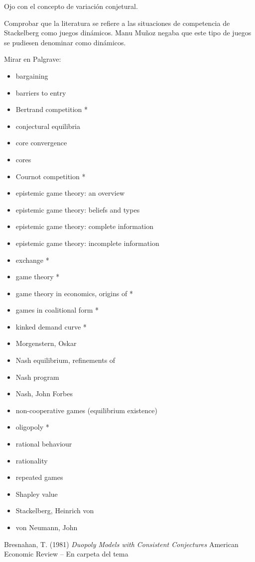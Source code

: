 \documentclass{nuevotema}
\begin{document}
Ojo con el concepto de variación conjetural. 

Comprobar que la literatura se refiere a las situaciones de competencia de Stackelberg como juegos dinámicos. Manu Muñoz negaba que este tipo de juegos se pudiesen denominar como dinámicos.

\bibliografia

Mirar en Palgrave:
\begin{itemize}
	\item bargaining
	\item barriers to entry
    \item Bertrand competition *
    \item conjectural equilibria
    \item core convergence
    \item cores
    \item Cournot competition *
	\item epistemic game theory: an overview
	\item epistemic game theory: beliefs and types
	\item epistemic game theory: complete information
	\item epistemic game theory: incomplete information
    \item exchange *
    \item game theory * 
    \item game theory in economics, origins of *
    \item games in coalitional form * 
    \item kinked demand curve *
    \item Morgenstern, Oskar
	\item Nash equilibrium, refinements of
	\item Nash program
    \item Nash, John Forbes
    \item non-cooperative games (equilibrium existence)
    \item oligopoly *
    \item rational behaviour
    \item rationality
    \item repeated games
    \item Shapley value
    \item Stackelberg, Heinrich von
    \item von Neumann, John
\end{itemize}

Bresnahan, T. (1981) \textit{Duopoly Models with Consistent Conjectures} American Economic Review -- En carpeta del tema
\end{document}
